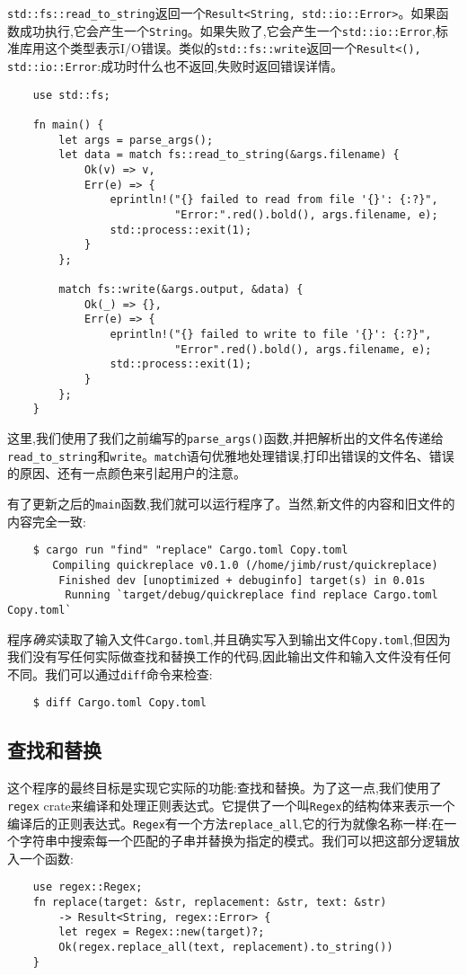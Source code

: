 \texttt{std::fs::read\_to\_string}返回一个\texttt{Result<String, std::io::Error>}。如果函数成功执行,它会产生一个\texttt{String}。如果失败了,它会产生一个\texttt{std::io::Error},标准库用这个类型表示I/O错误。类似的\texttt{std::fs::write}返回一个\texttt{Result<(), std::io::Error}:成功时什么也不返回,失败时返回错误详情。

\begin{verbatim}
    use std::fs;

    fn main() {
        let args = parse_args();
        let data = match fs::read_to_string(&args.filename) {
            Ok(v) => v,
            Err(e) => {
                eprintln!("{} failed to read from file '{}': {:?}",
                          "Error:".red().bold(), args.filename, e);
                std::process::exit(1);
            }
        };

        match fs::write(&args.output, &data) {
            Ok(_) => {},
            Err(e) => {
                eprintln!("{} failed to write to file '{}': {:?}",
                          "Error".red().bold(), args.filename, e);
                std::process::exit(1);
            }
        };
    }
\end{verbatim}

这里,我们使用了我们之前编写的\texttt{parse\_args()}函数,并把解析出的文件名传递给\texttt{read\_to\_string}和\texttt{write}。\texttt{match}语句优雅地处理错误,打印出错误的文件名、错误的原因、还有一点颜色来引起用户的注意。

有了更新之后的\texttt{main}函数,我们就可以运行程序了。当然,新文件的内容和旧文件的内容完全一致:
\begin{verbatim}
    $ cargo run "find" "replace" Cargo.toml Copy.toml
       Compiling quickreplace v0.1.0 (/home/jimb/rust/quickreplace)
        Finished dev [unoptimized + debuginfo] target(s) in 0.01s
         Running `target/debug/quickreplace find replace Cargo.toml Copy.toml`
\end{verbatim}

程序\emph{确实}读取了输入文件\texttt{Cargo.toml},并且确实写入到输出文件\texttt{Copy.toml},但因为我们没有写任何实际做查找和替换工作的代码,因此输出文件和输入文件没有任何不同。我们可以通过\texttt{diff}命令来检查:
\begin{verbatim}
    $ diff Cargo.toml Copy.toml
\end{verbatim}

\subsection{查找和替换}
这个程序的最终目标是实现它实际的功能:查找和替换。为了这一点,我们使用了\texttt{regex} crate来编译和处理正则表达式。它提供了一个叫\texttt{Regex}的结构体来表示一个编译后的正则表达式。\texttt{Regex}有一个方法\texttt{replace\_all},它的行为就像名称一样:在一个字符串中搜索每一个匹配的子串并替换为指定的模式。我们可以把这部分逻辑放入一个函数:
\begin{verbatim}
    use regex::Regex;
    fn replace(target: &str, replacement: &str, text: &str)
        -> Result<String, regex::Error> {
        let regex = Regex::new(target)?;
        Ok(regex.replace_all(text, replacement).to_string())
    }
\end{verbatim}

